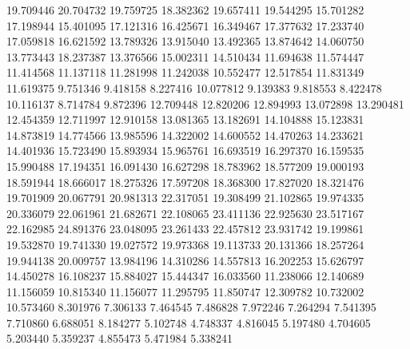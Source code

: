 19.709446
20.704732
19.759725
18.382362
19.657411
19.544295
15.701282
17.198944
15.401095
17.121316
16.425671
16.349467
17.377632
17.233740
17.059818
16.621592
13.789326
13.915040
13.492365
13.874642
14.060750
13.773443
18.237387
13.376566
15.002311
14.510434
11.694638
11.574447
11.414568
11.137118
11.281998
11.242038
10.552477
12.517854
11.831349
11.619375
9.751346
9.418158
8.227416
10.077812
9.139383
9.818553
8.422478
10.116137
8.714784
9.872396
12.709448
12.820206
12.894993
13.072898
13.290481
12.454359
12.711997
12.910158
13.081365
13.182691
14.104888
15.123831
14.873819
14.774566
13.985596
14.322002
14.600552
14.470263
14.233621
14.401936
15.723490
15.893934
15.965761
16.693519
16.297370
16.159535
15.990488
17.194351
16.091430
16.627298
18.783962
18.577209
19.000193
18.591944
18.666017
18.275326
17.597208
18.368300
17.827020
18.321476
19.701909
20.067791
20.981313
22.317051
19.308499
21.102865
19.974335
20.336079
22.061961
21.682671
22.108065
23.411136
22.925630
23.517167
22.162985
24.891376
23.048095
23.261433
22.457812
23.931742
19.199861
19.532870
19.741330
19.027572
19.973368
19.113733
20.131366
18.257264
19.944138
20.009757
13.984196
14.310286
14.557813
16.202253
15.626797
14.450278
16.108237
15.884027
15.444347
16.033560
11.238066
12.140689
11.156059
10.815340
11.156077
11.295795
11.850747
12.309782
10.732002
10.573460
8.301976
7.306133
7.464545
7.486828
7.972246
7.264294
7.541395
7.710860
6.688051
8.184277
5.102748
4.748337
4.816045
5.197480
4.704605
5.203440
5.359237
4.855473
5.471984
5.338241
